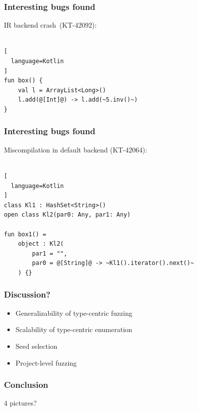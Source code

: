
\begin{frame}[fragile]
	\frametitle{Interesting bugs found}
	IR backend crash~(KT-42092):
	\ \\ \ \\
\begin{lstlisting}[
  language=Kotlin
]
fun box() {
    val l = ArrayList<Long>()
    l.add(@[Int]@) -> l.add(~5.inv()~)
}
\end{lstlisting}

\end{frame}

\begin{frame}[fragile]
	\frametitle{Interesting bugs found}
	Miscompilation in default backend (KT-42064):
	\ \\ \ \\
\begin{lstlisting}[
  language=Kotlin
]
class Kl1 : HashSet<String>()
open class Kl2(par0: Any, par1: Any)

fun box1() =
    object : Kl2(
        par1 = "",
        par0 = @[String]@ -> ~Kl1().iterator().next()~
    ) {}
\end{lstlisting}

\end{frame}


\begin{frame}
	\frametitle{Discussion?}
	\begin{itemize}
		\item Generalizability of type-centric fuzzing
		\item Scalability of type-centric enumeration
		\item Seed selection
		\item Project-level fuzzing
	\end{itemize}
\end{frame}


\begin{frame}
	\frametitle{Conclusion}
	4 pictures?
\end{frame}

